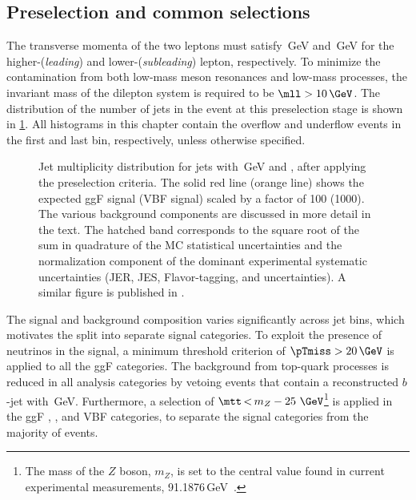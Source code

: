 \subsection{Preselection and common selections}
\label{subsec:preselection}
The transverse momenta of the two leptons must satisfy \,GeV and \,GeV for the higher-\pT (\emph{leading}) and lower-\pT (\emph{subleading}) lepton, respectively.
To minimize the contamination from both low-mass meson resonances and low-mass \Ztautau processes, the invariant mass of the dilepton system is required to be $\mll > 10\,\GeV$.
The distribution of the number of jets in the event at this preselection stage is shown in \cref{fig:njet-dist}.
All histograms in this chapter contain the overflow and underflow events in the first and last bin, respectively, unless otherwise specified.
\begin{figure}
  \caption[Jet multiplicity distribution after the preselection.]{Jet multiplicity distribution for jets with \,GeV and , after applying the preselection criteria. The solid red line (orange line) shows the expected ggF signal (VBF signal) scaled by a factor of 100 (1000). The various background components are discussed in more detail in the text. 
  The hatched band corresponds to the square root of the sum in quadrature of the MC statistical uncertainties and the normalization component of the dominant experimental systematic uncertainties (JER, JES, Flavor-tagging, and \MET uncertainties). 
  A similar figure is published in .}
  \label{fig:njet-dist}
\end{figure}
The signal and background composition varies significantly across jet bins, which motivates the split into separate \Njet signal categories.
To exploit the presence of neutrinos in the signal, a minimum threshold criterion of $\pTmiss > 20\,\GeV$ is applied to all the ggF categories.
The background from top-quark processes is reduced in all analysis categories by vetoing events that contain a reconstructed $b$-jet with \,GeV.
Furthermore, a selection of $\mtt\,{<}\,m_Z - 25~\GeV$\footnote{The mass of the $Z$ boson, $m_Z$, is set to the central value found in current experimental measurements, 91.1876\,GeV~\cite{PDG2020}.} is applied in the ggF \OneJet, \TwoJet, and VBF \TwoJet categories, to separate the signal categories from the majority of \Zgamma events.

